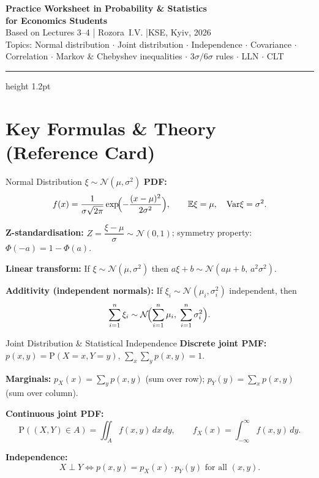 \documentclass[12pt,a4paper]{article}
\newcommand{\E}{\mathbb{E}}
\newcommand{\Var}{\mathrm{Var}}
\newcommand{\N}{\mathcal{N}}
\renewcommand{\P}{\mathrm{P}}
\begin{document}
\begin{center}
  {\LARGE\bfseries\color{kseblue}
    Practice Worksheet in Probability \& Statistics}\\[6pt]
  {\large\bfseries for Economics Students}\\[3pt]
  {\normalsize\color{gray}
    Based on Lectures 3--4 \quad|\quad
    Rozora~I.V. \quad|\quad KSE, Kyiv, 2026}\\[4pt]
  {\small\color{gray}
    Topics:\;
    Normal distribution $\cdot$
    Joint distribution $\cdot$
    Independence $\cdot$
    Covariance $\cdot$
    Correlation $\cdot$
    Markov \& Chebyshev inequalities $\cdot$
    $3\sigma/6\sigma$ rules $\cdot$ LLN $\cdot$ CLT
  }
  \vspace{4pt}\hrule height 1.2pt\vspace{4pt}
\end{center}

\section*{\color{kseblue}Key Formulas \& Theory (Reference Card)}

\begin{defbox}{Normal Distribution\; $\xi \sim \N(\mu,\sigma^2)$}
\textbf{PDF:}\quad
\[
f(x)=\frac{1}{\sigma\sqrt{2\pi}}
\exp\!\Bigl(-\frac{(x-\mu)^2}{2\sigma^2}\Bigr),
\qquad
\E\xi=\mu,\quad \Var\xi=\sigma^2.
\]

\textbf{Z-standardisation:}\quad
$Z=\dfrac{\xi-\mu}{\sigma}\sim\N(0,1)$;\qquad
symmetry property:\; $\Phi(-a)=1-\Phi(a)$.

\textbf{Linear transform:}\quad
If $\xi\sim\N(\mu,\sigma^2)$ then $a\xi+b\sim\N(a\mu+b,\,a^2\sigma^2)$.

\textbf{Additivity (independent normals):}\quad
If $\xi_i\sim\N(\mu_i,\sigma_i^2)$ independent, then
\[
\sum_{i=1}^n\xi_i
\sim
\N\!\Bigl(\sum_{i=1}^n\mu_i,\;\sum_{i=1}^n\sigma_i^2\Bigr).
\]
\end{defbox}

\vspace{4pt}

\begin{defbox}{Joint Distribution \& Statistical Independence}
\textbf{Discrete joint PMF:}\;
$p(x,y)=\P(X=x,Y=y)$,\; $\sum_x\sum_y p(x,y)=1$.

\textbf{Marginals:}\;
$p_X(x)=\sum_y p(x,y)$ (sum over row);\quad
$p_Y(y)=\sum_x p(x,y)$ (sum over column).

\textbf{Continuous joint PDF:}\;
\[
\P((X,Y)\in A)=\iint_A f(x,y)\,dx\,dy,\qquad
f_X(x)=\int_{-\infty}^{\infty}f(x,y)\,dy.
\]

\textbf{Independence:}\;
\[
X\perp Y
\Longleftrightarrow
p(x,y)=p_X(x)\cdot p_Y(y)
\text{ for all }(x,y).
\]
\end{defbox}
\end{document}

